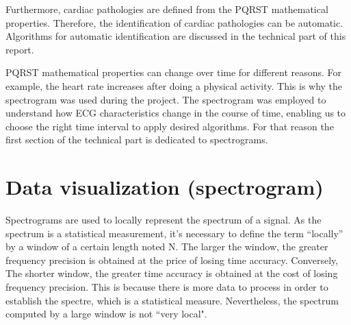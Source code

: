 \documentclass{article}
\begin{document}
Furthermore, cardiac pathologies are defined from the PQRST mathematical properties. Therefore, the identification of cardiac pathologies can be automatic. Algorithms for automatic identification are discussed in the technical part of this report.

PQRST mathematical properties can change over time for different reasons. For example, the heart rate increases after doing a physical activity. This is why the spectrogram was used during the project. The spectrogram was employed to understand how ECG characteristics change in the course of time, enabling us to choose the right time interval to apply desired algorithms. For that reason the first section of the technical part is dedicated to spectrograms.

\section{Data visualization (spectrogram) }
Spectrograms are used to locally represent the spectrum of a signal. As the spectrum is a statistical measurement, it’s necessary to define the term “locally” by a window of a certain length noted N. The larger the window, the greater frequency precision is obtained at the price of losing time accuracy. Conversely, The shorter window, the greater time accuracy is obtained at the cost of losing frequency precision. This is because there is more data to process in order to establish the spectre, which is a statistical measure. Nevertheless, the spectrum computed by a large window is not “very local".
\end{document}

